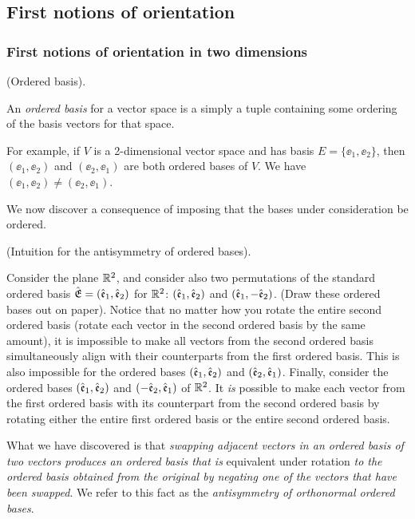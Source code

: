 \subsection*{First notions of orientation}

\subsubsection*{First notions of orientation in two dimensions}

\begin{defn}
    (Ordered basis).
    
    An \textit{ordered basis} for a vector space is a simply a tuple containing some ordering of the basis vectors for that space.
    
    For example, if $V$ is a 2-dimensional vector space and has basis $E = \{\ee_1, \ee_2\}$, then $(\ee_1, \ee_2)$ and $(\ee_2, \ee_1)$ are both ordered bases of $V$. We have $(\ee_1, \ee_2) \neq (\ee_2, \ee_1)$.
\end{defn}

We now discover a consequence of imposing that the bases under consideration be ordered.

\begin{deriv}
\label{ch::lin_alg::deriv::ordered_bases_antisymmetry_intuition}
    (Intuition for the antisymmetry of ordered bases).
    
    Consider the plane $\mathbb{R}^2$, and consider also two permutations of the standard ordered basis ${\hat{\mathfrak{E}}} = (\hat{\mathfrak{e}}_1, \hat{\mathfrak{e}}_2)$ for $\mathbb{R}^2$: $(\hat{\mathfrak{e}}_1, \hat{\mathfrak{e}}_2)$ and $(\hat{\mathfrak{e}}_1, -\hat{\mathfrak{e}}_2)$. (Draw these ordered bases out on paper). Notice that no matter how you rotate the entire second ordered basis (rotate each vector in the second ordered basis by the same amount), it is impossible to make all vectors from the second ordered basis simultaneously align with their counterparts from the first ordered basis. This is also impossible for the ordered bases $(\hat{\mathfrak{e}}_1, \hat{\mathfrak{e}}_2)$ and $(\hat{\mathfrak{e}}_2, \hat{\mathfrak{e}}_1)$. Finally, consider the ordered bases $(\hat{\mathfrak{e}}_1, \hat{\mathfrak{e}}_2)$ and $(-\hat{\mathfrak{e}}_2, \hat{\mathfrak{e}}_1)$ of $\mathbb{R}^2$. It \textit{is} possible to make each vector from the first ordered basis with its counterpart from the second ordered basis by rotating either the entire first ordered basis or the entire second ordered basis.
    
    What we have discovered is that \textit{swapping adjacent vectors in an ordered basis of two vectors produces an ordered basis that is} equivalent under rotation \textit{to the ordered basis obtained from the original by negating one of the vectors that have been swapped}. We refer to this fact as the \textit{antisymmetry of orthonormal ordered bases}.
\end{deriv}

